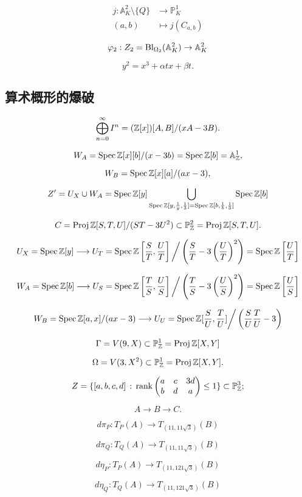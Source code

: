 \[
	\begin{aligned}
		j:\mathbb A_K^2\setminus \{Q\}&\longrightarrow \mathbb P_K^1 \\
		(a,b)&\longmapsto j(C_{a,b})
	\end{aligned}
\]

\[
	\varphi_2:Z_2=\operatorname{Bl}_{\Omega_2}(\mathbb A_K^2)\to \mathbb A_K^2
\]

\[
	y^2=x^3+\alpha tx+\beta t.
\]

\subsection{算术概形的爆破}\label{s:4.2.4}

\[
	\bigoplus_{n=0}^\infty I^n=(\mathbb{Z}[x])[A,B]/(xA-3B).
\]

\[
	W_A=\operatorname{Spec} \mathbb{Z}[x][b]/(x-3b)=\operatorname{Spec} \mathbb{Z}[b]=\mathbb A_{\mathbb{Z}}^1,
\]

\[
	W_B=\operatorname{Spec} \mathbb{Z}[x][a]/(ax-3),
\]

\[
	Z'=U_X\cup W_A=\operatorname{Spec} \mathbb{Z}[y]\bigcup_{\operatorname{Spec} \mathbb{Z}[y,\frac 1y,\frac 13]=\operatorname{Spec} \mathbb{Z}[b,\frac 1b,\frac 13]}\operatorname{Spec} \mathbb{Z}[b]
\]

\[
	C=\operatorname{Proj} \mathbb{Z}[S,T,U]/(ST-3U^2)\subset \mathbb P_{\mathbb{Z}}^2=\operatorname{Proj} \mathbb{Z}[S,T,U].
\]


\[
	U_X=\operatorname{Spec} \mathbb{Z}[y]\longrightarrow U_T=\operatorname{Spec} \mathbb{Z} \left[\frac ST,\frac UT\right]\bigg / \left(\frac ST-3\left(\frac UT\right)^2\right)=\operatorname{Spec} \mathbb{Z} \left[\frac UT\right]
\]

\[
	W_A=\operatorname{Spec} \mathbb{Z}[b]\longrightarrow U_S=\operatorname{Spec} \mathbb{Z} \left[\frac TS,\frac US\right]\bigg / \left(\frac TS-3\left(\frac US\right)^2\right)=\operatorname{Spec} \mathbb{Z} \left[\frac US\right]
\]

\[
	W_B=\operatorname{Spec} \mathbb{Z}[a,x]/(ax-3)\longrightarrow U_U=\operatorname{Spec} \mathbb{Z}[\frac SU,\frac TU]\bigg / \left(\frac SU \frac TU-3\right)
\]

\[
	\Gamma = V(9,X)\subset \mathbb P_{\mathbb{Z}}^1=\operatorname{Proj} \mathbb{Z}[X,Y]
\]

\[
	\Omega=V(3,X^2)\subset \mathbb P_{\mathbb{Z}}^1=\operatorname{Proj} \mathbb{Z}[X,Y].
\]

\[
	Z=\{[a,b,c,d]\,:\,\operatorname{rank}\begin{pmatrix}
		a&c&3d\\ b&d&a
	\end{pmatrix}\leq 1\}\subset \mathbb P_{\mathbb{Z}}^3;
\]

\[
	A\longrightarrow B\longrightarrow C.
\]

\[
	d\pi_P:T_P(A)\longrightarrow T_{(11,11\sqrt 3)}(B)
\]

\[
	d\pi_Q:T_Q(A)\longrightarrow T_{(11,11\sqrt 3)}(B)
\]

\[
	d\eta_P:T_P(A)\longrightarrow T_{(11,121\sqrt 3)}(B)
\]


\[
	d\eta_Q:T_Q(A)\longrightarrow T_{(11,121\sqrt 3)}(B)
\]
